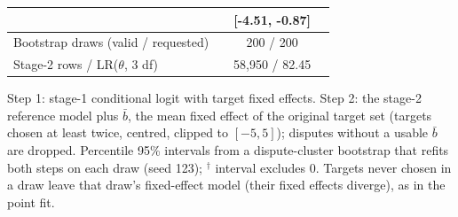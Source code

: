 \documentclass[11pt]{article}
\begin{document}
\begin{table}[!htbp]
\begin{tabular}{lccc}
 &  & [-4.51, -0.87] &  \\
\midrule
Bootstrap draws (valid / requested) & \multicolumn{3}{c}{200 / 200} \\
Stage-2 rows / LR($\theta$, 3 df) & \multicolumn{3}{c}{58,950 / 82.45} \\
\bottomrule
\end{tabular}
\begin{minipage}{0.95\linewidth}\footnotesize\smallskip Step 1: stage-1 conditional logit with target fixed effects. Step 2: the stage-2 reference model plus $\bar b$, the mean fixed effect of the original target set (targets chosen at least twice, centred, clipped to $[-5,5]$); disputes without a usable $\bar b$ are dropped. Percentile 95\% intervals from a dispute-cluster bootstrap that refits both steps on each draw (seed 123); $^{\dagger}$ interval excludes 0. Targets never chosen in a draw leave that draw's fixed-effect model (their fixed effects diverge), as in the point fit.\end{minipage}
\end{table}
\end{document}
